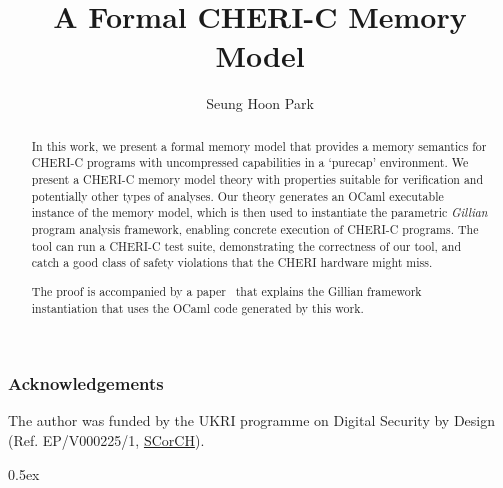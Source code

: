 \documentclass[11pt,a4paper]{article}
\begin{document}
\title{A Formal CHERI-C Memory Model}
\author{Seung Hoon Park}
\maketitle

\begin{abstract}
%
In this work, we present a formal memory model that provides a memory
semantics for CHERI-C programs with uncompressed capabilities in a `purecap'
environment. We present a CHERI-C memory model theory with
properties suitable for verification and potentially other types of
analyses. Our theory generates an OCaml executable instance of the memory model,
which is then used to instantiate the parametric \textit{Gillian}
program analysis framework, enabling concrete execution of
CHERI-C programs. The tool can run a CHERI-C test suite, demonstrating the
correctness of our tool, and catch a good class of safety violations that the
CHERI hardware might miss.

The proof is accompanied by a paper~\cite{park_2022} that explains the Gillian
framework instantiation that uses the OCaml code generated by this work.
\end{abstract}

\tableofcontents
\subsubsection*{Acknowledgements}
The author was funded by the UKRI programme on Digital Security by Design 
(Ref. EP/V000225/1, \href{https://scorch-project.github.io/}{SCorCH}).
\newpage

\parindent 0pt\parskip 0.5ex





\end{document}
